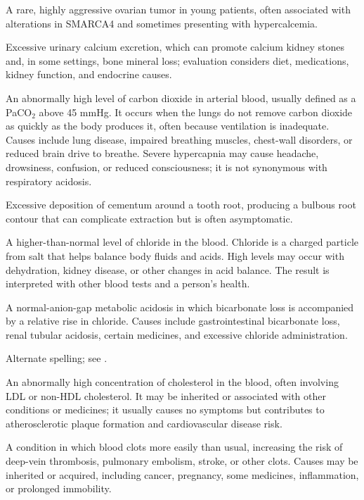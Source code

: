  A rare, highly aggressive ovarian tumor in young patients, often associated with alterations in SMARCA4 and sometimes presenting with hypercalcemia.

 Excessive urinary calcium excretion, which can promote calcium kidney stones and, in some settings, bone mineral loss; evaluation considers diet, medications, kidney function, and endocrine causes.

 An abnormally high level of carbon dioxide in arterial blood, usually defined as a PaCO$_2$ above 45 mmHg. It occurs when the lungs do not remove carbon dioxide as quickly as the body produces it, often because ventilation is inadequate. Causes include lung disease, impaired breathing muscles, chest-wall disorders, or reduced brain drive to breathe. Severe hypercapnia may cause headache, drowsiness, confusion, or reduced consciousness; it is not synonymous with respiratory acidosis.

 Excessive deposition of cementum around a tooth root, producing a bulbous root contour that can complicate extraction but is often asymptomatic.

 A higher-than-normal level of chloride in the blood. Chloride is a charged
particle from salt that helps balance body fluids and acids. High levels may occur with
dehydration, kidney disease, or other changes in acid balance. The result is interpreted
with other blood tests and a person's health.

 A normal-anion-gap metabolic acidosis in which bicarbonate loss is accompanied by a relative rise in chloride. Causes include gastrointestinal bicarbonate loss, renal tubular acidosis, certain medicines, and excessive chloride administration.

 Alternate spelling; see .

 An abnormally high concentration of cholesterol in the blood, often involving LDL or non-HDL cholesterol. It may be inherited or associated with other conditions or medicines; it usually causes no symptoms but contributes to atherosclerotic plaque formation and cardiovascular disease risk.

 A condition in which blood clots more easily than usual, increasing the risk of deep-vein thrombosis, pulmonary embolism, stroke, or other clots. Causes may be inherited or acquired, including cancer, pregnancy, some medicines, inflammation, or prolonged immobility.

